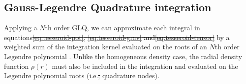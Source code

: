 \documentclass[extra, referee]{gji}
\providecommand{\DIFaddtex}[1]{{\protect\color{blue}\uwave{#1}}} %
\providecommand{\DIFdeltex}[1]{{\protect\color{red}\sout{#1}}}                      %
\providecommand{\DIFaddbegin}{} %
\providecommand{\DIFaddend}{} %
\providecommand{\DIFdelbegin}{} %
\providecommand{\DIFdelend}{} %
\providecommand{\DIFadd}[1]{\texorpdfstring{\DIFaddtex{#1}}{#1}} %
\providecommand{\DIFdel}[1]{\texorpdfstring{\DIFdeltex{#1}}{}} %
\newcommand{\DIFscaledelfig}{0.5}
\newlength{\DIFdelgraphicswidth} %
\newlength{\DIFdelgraphicsheight} %
\newcommand{\DIFaddincludegraphics}[2][]{{\color{blue}\fbox{\DIFOincludegraphics[#1]{#2}}}} %
\newcommand{\DIFdelincludegraphics}[2][]{%
\sbox{\DIFdelgraphicsbox}{\DIFOincludegraphics[#1]{#2}}%
\settoboxwidth{\DIFdelgraphicswidth}{\DIFdelgraphicsbox} %
\settoboxtotalheight{\DIFdelgraphicsheight}{\DIFdelgraphicsbox} %
\scalebox{\DIFscaledelfig}{%
\parbox[b]{\DIFdelgraphicswidth}{\usebox{\DIFdelgraphicsbox}\\[-\baselineskip] \rule{\DIFdelgraphicswidth}{0em}}\llap{\resizebox{\DIFdelgraphicswidth}{\DIFdelgraphicsheight}{%
\setlength{\unitlength}{\DIFdelgraphicswidth}%
\begin{picture}(1,1)%
\thicklines\linethickness{2pt} %
{\color[rgb]{1,0,0}\put(0,0){\framebox(1,1){}}}%
{\color[rgb]{1,0,0}\put(0,0){\line( 1,1){1}}}%
{\color[rgb]{1,0,0}\put(0,1){\line(1,-1){1}}}%
\end{picture}%
}\hspace*{3pt}}} %
} %
\DeclareRobustCommand{\DIFaddbegin}{\DIFOaddbegin \let\includegraphics\DIFaddincludegraphics} %
\DeclareRobustCommand{\DIFaddend}{\DIFOaddend \let\includegraphics\DIFOincludegraphics} %
\DeclareRobustCommand{\DIFdelbegin}{\DIFOdelbegin \let\includegraphics\DIFdelincludegraphics} %
\DeclareRobustCommand{\DIFdelend}{\DIFOaddend \let\includegraphics\DIFOincludegraphics} %
\begin{document}
\subsection{Gauss-Legendre Quadrature integration}

Applying a $N$th order GLQ, we can approximate each integral in
equations\DIFdelbegin \DIFdel{\ref{eq:tesseroid-pot}, \ref{eq:tesseroid-grav} and\ref{eq:tesseroid-tensor} }\DIFdelend \DIFaddbegin \DIFadd{~\ref{eq:tesseroid-pot} and~\ref{eq:tesseroid-grav} }\DIFaddend by a weighted sum of the
integration kernel evaluated on the roots of an $N$th order Legendre polynomial
\citep[p.~390]{Hildebrand1987}.
Unlike the homogeneous density case, the radial density function $\rho(r)$ must also be
included in the integration and evaluated on the Legendre polynomial roots
(i.e.\DIFdelbegin \DIFdel{,
}\DIFdelend \DIFaddbegin \DIFadd{~}\DIFaddend quadrature nodes).
\end{document}
